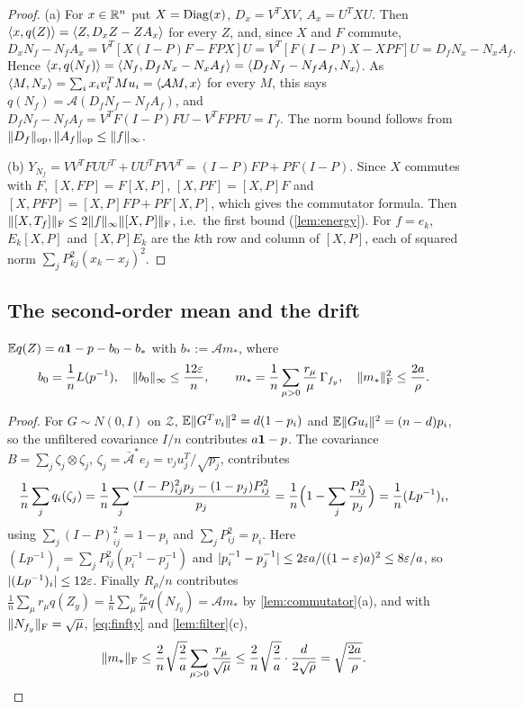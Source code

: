 \begin{proof}
(a) For $x\in\mathbb R^n$ put $X=\operatorname{Diag}(x)$, $D_x=V^TXV$, $A_x=U^TXU$. Then
$\langle x,q(Z)\rangle=\langle Z,D_xZ-ZA_x\rangle$ for every $Z$, and, since $X$ and $F$ commute,
\[
 D_xN_f-N_fA_x=V^T[X(I-P)F-FPX]U=V^T[F(I-P)X-XPF]U=D_fN_x-N_xA_f .
\]
Hence $\langle x,q(N_f)\rangle=\langle N_f,D_fN_x-N_xA_f\rangle=\langle D_fN_f-N_fA_f,N_x\rangle$. As
$\langle M,N_x\rangle=\sum_ix_iv_i^TMu_i=\langle \mathcal AM,x\rangle$ for every $M$, this says
$q(N_f)=\mathcal A(D_fN_f-N_fA_f)$, and
$D_fN_f-N_fA_f=V^TF(I-P)FU-V^TFPFU=\Gamma_f$. The norm bound follows from
$\lVert D_f\rVert_{\mathrm{op}},\lVert A_f\rVert_{\mathrm{op}}\le\lVert f\rVert_\infty$.

(b) $Y_{N_f}=VV^TFUU^T+UU^TFVV^T=(I-P)FP+PF(I-P)$. Since $X$ commutes with $F$,
$[X,FP]=F[X,P]$, $[X,PF]=[X,P]F$ and $[X,PFP]=[X,P]FP+PF[X,P]$, which gives the
commutator formula. Then $\lVert [X,T_f]\rVert_{\mathrm F}\le2\lVert f\rVert_\infty\lVert [X,P]\rVert_{\mathrm F}$, i.e.\ the
first bound (\cref{lem:energy}). For $f=e_k$, $E_k[X,P]$ and $[X,P]E_k$ are
the $k$th row and column of $[X,P]$, each of squared norm
$\sum_jP_{kj}^2(x_k-x_j)^2$.
\end{proof}

\subsection{The second-order mean and the drift}

\begin{lemma}[Mean]\label{lem:mean}
$\mathbb E q(Z)=a\mathbf 1-p-b_0-b_*$ with $b_*:=\mathcal Am_*$, where
\[
 b_0=\frac1nL(p^{-1}),\quad \lVert b_0\rVert_\infty\le\frac{12\varepsilon}n,\qquad
 m_*=\frac1n\sum_{\mu>0}\frac{r_\mu}\mu\,\Gamma_{f_y},\quad
 \lVert m_*\rVert_{\mathrm F}^2\le\frac{2a}\rho .
\]
\end{lemma}

\begin{proof}
For $G\sim N(0,I)$ on $\mathcal Z$, $\mathbb E\lVert G^Tv_i\rVert^2=d(1-p_i)$ and
$\mathbb E\lVert Gu_i\rVert^2=(n-d)p_i$, so the unfiltered covariance $I/n$ contributes
$a\mathbf 1-p$. The covariance $B=\sum_j\zeta_j\otimes\zeta_j$, $\zeta_j=\bar{\mathcal
A}^*e_j=v_ju_j^T/\sqrt{p_j}$, contributes
\[
 \frac1n\sum_jq_i(\zeta_j)=\frac1n\sum_j\frac{(I-P)_{ij}^2p_j-(1-p_j)P_{ij}^2}{p_j}
 =\frac1n\Bigl(1-\sum_j\frac{P_{ij}^2}{p_j}\Bigr)=\frac1n(Lp^{-1})_i ,
\]
using $\sum_j(I-P)_{ij}^2=1-p_i$ and $\sum_jP_{ij}^2=p_i$. Here
$(Lp^{-1})_i=\sum_jP_{ij}^2(p_i^{-1}-p_j^{-1})$ and
$|p_i^{-1}-p_j^{-1}|\le2\varepsilon a/((1-\varepsilon)a)^2\le8\varepsilon/a$, so
$|(Lp^{-1})_i|\le12\varepsilon$. Finally $R_\rho/n$ contributes
$\frac1n\sum_\mu r_\mu q(Z_y)=\frac1n\sum_\mu\frac{r_\mu}\mu q(N_{f_y})=\mathcal
Am_*$ by \cref{lem:commutator}(a), and with $\lVert N_{f_y}\rVert_{\mathrm F}=\sqrt\mu$,
\eqref{eq:finfty} and \cref{lem:filter}(c),
\[
 \lVert m_*\rVert_{\mathrm F}\le\frac2n\sqrt{\frac2a}\sum_{\mu>0}\frac{r_\mu}{\sqrt\mu}
 \le\frac2n\sqrt{\frac2a}\cdot\frac d{2\sqrt\rho}=\sqrt{\frac{2a}\rho}.\qedhere
\]
\end{proof}

